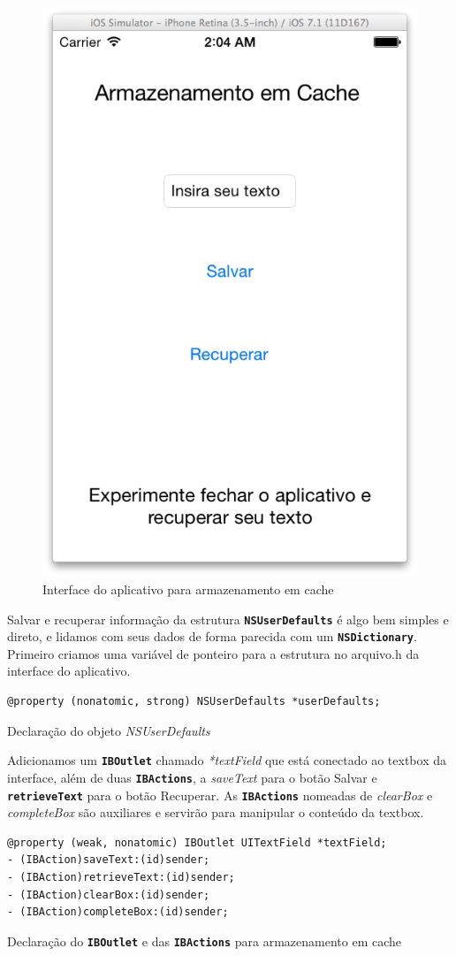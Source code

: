 \documentclass[a4paper,12pt,brazil,oneside]{book}
\begin{document}
\begin{figure}[H]
  \centering
  \includegraphics[width=.55\textwidth]{figuras/4/interface_api_cache.png}
  \caption{Interface do aplicativo para armazenamento em cache}
  \label{fig:app_interface_cache}
\end{figure}

Salvar e recuperar informação da estrutura \texttt{\textbf{NSUserDefaults}} é algo bem simples e direto, e lidamos com seus dados de forma parecida com um \texttt{\textbf{NSDictionary}}. Primeiro criamos uma variável de ponteiro para a estrutura no arquivo.h da interface do aplicativo.

\begin{listing}[H]
\begin{verbatim}
@property (nonatomic, strong) NSUserDefaults *userDefaults;
\end{verbatim}
\caption{Declaração do objeto \emph{NSUserDefaults}}
\end{listing}

Adicionamos um \texttt{\textbf{IBOutlet}} chamado \emph{*textField} que está conectado ao textbox da interface, além de duas \texttt{\textbf{IBActions}}, a \emph{saveText} para o botão Salvar e \texttt{\textbf{retrieveText}} para o botão Recuperar.
As \texttt{\textbf{IBActions}} nomeadas de \emph{clearBox} e \emph{completeBox} são auxiliares e servirão para manipular o conteúdo da textbox.

\begin{listing}[H]
\begin{verbatim}
@property (weak, nonatomic) IBOutlet UITextField *textField;
- (IBAction)saveText:(id)sender;
- (IBAction)retrieveText:(id)sender;
- (IBAction)clearBox:(id)sender;
- (IBAction)completeBox:(id)sender;
\end{verbatim}
\caption{Declaração do \texttt{\textbf{IBOutlet}} e das \texttt{\textbf{IBActions}} para armazenamento em cache}
\end{listing}
\end{document}
